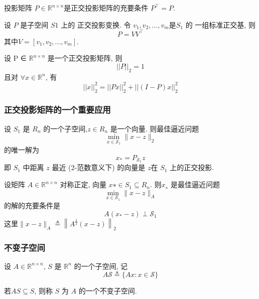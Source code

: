 \documentclass[12pt,a4paper]{article}
\begin{document}
\begin{framed}
	\begin{theorem}
		投影矩阵 $P ∈\mathbb{R}^{n×n}$是正交投影矩阵的充要条件 $P^{\top} = P$.
	\end{theorem}
\end{framed}

\begin{framed}
	\begin{corollary}
		设 $P$ 是子空间 $S1$ 上的 正交投影变换. 令 $v_1, v_2, . . . , v_m $是$ S_1$ 的
		一组标准正交基, 则
		$$
		P=V V^{\top}
		$$
		其中$ V = [v_1, v_2, . . . , v_m].$
	\end{corollary}
\end{framed}

\begin{framed}
	\begin{property}
		设 P ∈ $\mathbb{R}^{n×n}$ 是一个正交投影矩阵, 则
		$$
		||P||_{2}=1
		$$
		且对 $∀ x ∈ \mathbb{R}^n$, 有
		$$
		||x||_{2}^{2}=||P x||_{2}^{2}+||(I-P) x||_{2}^{2}
		$$
	\end{property}
\end{framed}

\subsubsection{正交投影矩阵的一个重要应用}
\begin{framed}
	\begin{theorem}
		设 $S_1$ 是 $R_n$ 的一个子空间,$ z ∈ R_n$ 是一个向量. 则最佳逼近问题
	$$
	\min _{x \in \mathcal{S}_{1}}\|x-z\|_{2}
	$$
	的唯一解为
	 $$
	 x_{*}=P_{\mathcal{S}_{1}} z
	 $$
	 即 $S_1$ 中距离 $z$ 最近 (2-范数意义下) 的向量是 $z $在 $S
	 _1$ 上的正交投影.
	\end{theorem}
\end{framed}

\begin{framed}
	\begin{corollary}
	设矩阵 $A ∈ \mathbb{R}^{n×n}$ 对称正定, 向量 $x∗ ∈ S_1 ⊆ R_n.$ 则$ x_∗$ 是最佳逼近问题
	$$
	\min _{x \in \mathcal{S}_{1}}\|x-z\|_{A}
	$$
	的解的充要条件是
	$$
	A\left(x_{*}-z\right) \perp \mathcal{S}_{1}
	$$
	这里$\|x-z\|_{A} \triangleq\left\|A^{\frac{1}{2}}(x-z)\right\|_{2}$
	\end{corollary}
\end{framed}

\subsubsection{不变子空间}
设 $A ∈ \mathbb{R}^{n×n}$, $S$ 是 $\mathbb{R}^n$ 的一个子空间, 记
$$
A \mathcal{S} \triangleq\{A x : x \in \mathcal{S}\}
$$
\begin{framed}
	\begin{definition}
	 若$ AS ⊆ S$, 则称 $S$ 为 $A$ 的一个不变子空间.	
	\end{definition}
\end{framed}
\end{document}
